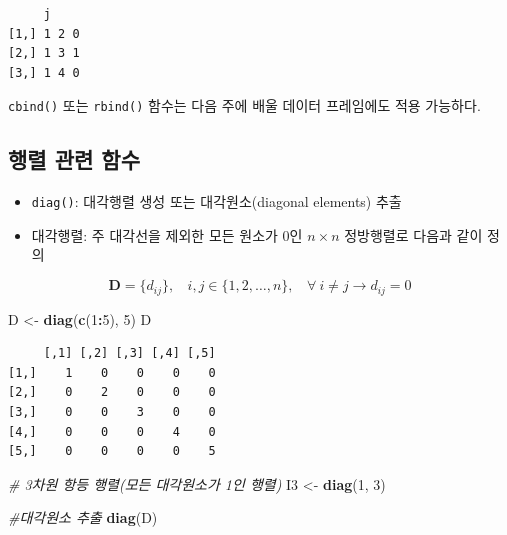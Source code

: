 \documentclass[
  11pt,
]{krantz}
\makeatletter
\newenvironment{Shaded}{\begin{snugshade}}{\end{snugshade}}
\newcommand{\CommentTok}[1]{\textcolor[rgb]{0.37,0.37,0.37}{\textit{#1}}}
\newcommand{\DecValTok}[1]{\textcolor[rgb]{0.06,0.06,0.06}{#1}}
\newcommand{\KeywordTok}[1]{\textcolor[rgb]{0.27,0.27,0.27}{\textbf{#1}}}
\newcommand{\NormalTok}[1]{#1}
\newcommand{\OperatorTok}[1]{\textcolor[rgb]{0.43,0.43,0.43}{\textbf{#1}}}
\newcommand{\StringTok}[1]{\textcolor[rgb]{0.5,0.5,0.5}{#1}}
\providecommand{\tightlist}{%
  \setlength{\itemsep}{0pt}\setlength{\parskip}{0pt}}
\newenvironment{kframe}{%
\medskip{}
\setlength{\fboxsep}{.8em}
 \def\at@end@of@kframe{}%
 \ifinner\ifhmode%
  \def\at@end@of@kframe{\end{minipage}}%
  \begin{minipage}{\columnwidth}%
 \fi\fi%
 \def\FrameCommand##1{\hskip\@totalleftmargin \hskip-\fboxsep
 \colorbox{shadecolor}{##1}\hskip-\fboxsep
     \hskip-\linewidth \hskip-\@totalleftmargin \hskip\columnwidth}%
 \MakeFramed {\advance\hsize-\width
   \@totalleftmargin\z@ \linewidth\hsize
   \@setminipage}}%
 {\par\unskip\endMakeFramed%
 \at@end@of@kframe}
\newenvironment{rmdblock}[1]
  {
  \begin{itemize}
  \renewcommand{\labelitemi}{
    \raisebox{-.7\height}[0pt][0pt]{
      {\setkeys{Gin}{width=3em,keepaspectratio}\texttt{[image: images/\#1]}}
    }
  }
  \setlength{\fboxsep}{1em}
  \begin{kframe}
  \item
  }
  {
  \end{kframe}
  \end{itemize}
  }
\newenvironment{rmdnote}
  {\begin{rmdblock}{note}}
  {\end{rmdblock}}
\makeatother
\begin{document}
\begin{verbatim}
     j    
[1,] 1 2 0
[2,] 1 3 1
[3,] 1 4 0
\end{verbatim}

\normalsize

\footnotesize

\begin{rmdnote}
\begin{rmdnote}

\texttt{cbind()} 또는 \texttt{rbind()} 함수는 다음 주에 배울 데이터 프레임에도 적용 가능하다.

\end{rmdnote}
\end{rmdnote}

\normalsize

\hypertarget{uxd589uxb82c-uxad00uxb828-uxd568uxc218}{%
\subsection{행렬 관련 함수}\label{uxd589uxb82c-uxad00uxb828-uxd568uxc218}}

\begin{itemize}
\tightlist
\item
  \texttt{diag()}: 대각행렬 생성 또는 대각원소(diagonal elements) 추출
\item
  대각행렬: 주 대각선을 제외한 모든 원소가 0인 \(n\times n\) 정방행렬로 다음과 같이 정의
\end{itemize}

\[
 \mathrm{\mathbf{D}} = \{d_{ij}\},~~~~i, j \in \{1, 2, \ldots, n\},~~~~\forall~ i \neq j \rightarrow d_{ij} = 0
\]
\footnotesize

\begin{Shaded}
\begin{Highlighting}[]
\NormalTok{D <-}\StringTok{ }\KeywordTok{diag}\NormalTok{(}\KeywordTok{c}\NormalTok{(}\DecValTok{1}\OperatorTok{:}\DecValTok{5}\NormalTok{), }\DecValTok{5}\NormalTok{)}
\NormalTok{D}
\end{Highlighting}
\end{Shaded}

\begin{verbatim}
     [,1] [,2] [,3] [,4] [,5]
[1,]    1    0    0    0    0
[2,]    0    2    0    0    0
[3,]    0    0    3    0    0
[4,]    0    0    0    4    0
[5,]    0    0    0    0    5
\end{verbatim}

\begin{Shaded}
\begin{Highlighting}[]
\CommentTok{# 3차원 항등 행렬(모든 대각원소가 1인 행렬)}
\NormalTok{I3 <-}\StringTok{ }\KeywordTok{diag}\NormalTok{(}\DecValTok{1}\NormalTok{, }\DecValTok{3}\NormalTok{)}

\CommentTok{#대각원소 추출}
\KeywordTok{diag}\NormalTok{(D)}
\end{Highlighting}
\end{Shaded}
\end{document}
